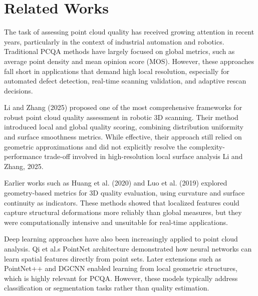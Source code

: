 \section{Related Works}
The task of assessing point cloud quality has received growing attention in recent years, particularly in the context of industrial automation and robotics. Traditional PCQA methods have largely focused on global metrics, such as average point density and mean opinion score (MOS). However, these approaches fall short in applications that demand high local resolution, especially for automated defect detection, real-time scanning validation, and adaptive rescan decisions.

Li and Zhang (2025) proposed one of the most comprehensive frameworks for robust point cloud quality assessment in robotic 3D scanning. Their method introduced local and global quality scoring, combining distribution uniformity and surface smoothness metrics. While effective, their approach still relied on geometric approximations and did not explicitly resolve the complexity-performance trade-off involved in high-resolution local surface analysis Li and Zhang, 2025.

Earlier works such as Huang et al. (2020) and Luo et al. (2019) explored geometry-based metrics for 3D quality evaluation, using curvature and surface continuity as indicators. These methods showed that localized features could capture structural deformations more reliably than global measures, but they were computationally intensive and unsuitable for real-time applications.

Deep learning approaches have also been increasingly applied to point cloud analysis. Qi et al.s PointNet architecture demonstrated how neural networks can learn spatial features directly from point sets. Later extensions such as PointNet++ and DGCNN enabled learning from local geometric structures, which is highly relevant for PCQA. However, these models typically address classification or segmentation tasks rather than quality estimation.